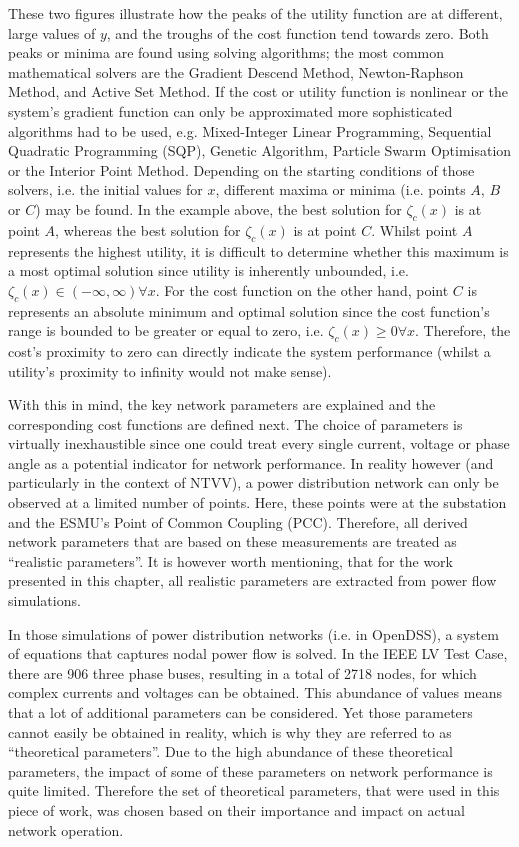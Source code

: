 These two figures illustrate how the peaks of the utility function are at different, large values of $y$, and the troughs of the cost function tend towards zero.
Both peaks or minima are found using solving algorithms; the most common mathematical solvers are the Gradient Descend Method, Newton-Raphson Method, and Active Set Method.
If the cost or utility function is nonlinear or the system's gradient function can only be approximated more sophisticated algorithms had to be used, e.g. Mixed-Integer Linear Programming, Sequential Quadratic Programming (SQP), Genetic Algorithm, Particle Swarm Optimisation or the Interior Point Method.
Depending on the starting conditions of those solvers, i.e. the initial values for $x$, different maxima or minima (i.e. points $A$, $B$ or $C$) may be found.
In the example above, the best solution for $\zeta_{c}(x)$ is at point $A$, whereas the best solution for $\zeta_{c}(x)$ is at point $C$.
Whilst point $A$ represents the highest utility, it is difficult to determine whether this maximum is a most optimal solution since utility is inherently unbounded, i.e. $\zeta_{c}(x) \in (-\infty, \infty) \forall x$.
For the cost function on the other hand, point $C$ is represents an absolute minimum and optimal solution since the cost function's range is bounded to be greater or equal to zero, i.e. $\zeta_{c}(x) \geq 0 \forall x$.
Therefore, the cost's proximity to zero can directly indicate the system performance (whilst a utility's proximity to infinity would not make sense).

With this in mind, the key network parameters are explained and the corresponding cost functions are defined next.
The choice of parameters is virtually inexhaustible since one could treat every single current, voltage or phase angle as a potential indicator for network performance.
In reality however (and particularly in the context of NTVV), a power distribution network can only be observed at a limited number of points.
Here, these points were at the substation and the ESMU's Point of Common Coupling (PCC).
Therefore, all derived network parameters that are based on these measurements are treated as ``realistic parameters''.
It is however worth mentioning, that for the work presented in this chapter, all realistic parameters are extracted from power flow simulations.

In those simulations of power distribution networks (i.e. in OpenDSS), a system of equations that captures nodal power flow is solved.
In the IEEE LV Test Case, there are 906 three phase buses, resulting in a total of 2718 nodes, for which complex currents and voltages can be obtained.
This abundance of values means that a lot of additional parameters can be considered.
Yet those parameters cannot easily be obtained in reality, which is why they are referred to as ``theoretical parameters''.
Due to the high abundance of these theoretical parameters, the impact of some of these parameters on network performance is quite limited.
Therefore the set of theoretical parameters, that were used in this piece of work, was chosen based on their importance and impact on actual network operation.

